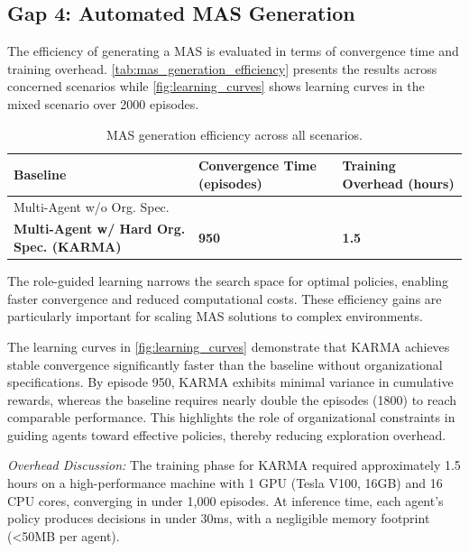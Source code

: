 \documentclass[conference]{IEEEtran}
\begin{document}
\subsection{Gap 4: Automated MAS Generation}

The efficiency of generating a MAS is evaluated in terms of convergence time and training overhead. \autoref{tab:mas_generation_efficiency} presents the results across concerned scenarios while \autoref{fig:learning_curves} shows learning curves in the mixed scenario over 2000 episodes.

\begin{table}[h]
    \centering
    \caption{MAS generation efficiency across all scenarios.}
    \label{tab:mas_generation_efficiency}{
        \footnotesize
        \begin{tabular}{>{\raggedright\arraybackslash}m{3.5cm}>{\centering\arraybackslash}m{2cm}>{\centering\arraybackslash}m{2cm}}
            \hline
            \textbf{Baseline}                               & \textbf{Convergence Time (episodes)} & \textbf{Training Overhead (hours)} \\
            \hline
            Multi-Agent w/o Org. Spec.                      & 1800                                 & 4                                  \\
            \textbf{Multi-Agent w/ Hard Org. Spec. (KARMA)} & \textbf{950}                         & \textbf{1.5}                       \\
            \hline
        \end{tabular}}
\end{table}

The role-guided learning narrows the search space for optimal policies, enabling faster convergence and reduced computational costs. These efficiency gains are particularly important for scaling MAS solutions to complex environments.

The learning curves in \autoref{fig:learning_curves} demonstrate that KARMA achieves stable convergence significantly faster than the baseline without organizational specifications. By episode 950, KARMA exhibits minimal variance in cumulative rewards, whereas the baseline requires nearly double the episodes (1800) to reach comparable performance. This highlights the role of organizational constraints in guiding agents toward effective policies, thereby reducing exploration overhead.

\noindent \textit{Overhead Discussion:} The training phase for KARMA required approximately 1.5 hours on a high-performance machine with 1 GPU (Tesla V100, 16GB) and 16 CPU cores, converging in under 1,000 episodes. At inference time, each agent's policy produces decisions in under 30ms, with a negligible memory footprint (<50MB per agent).
\end{document}
